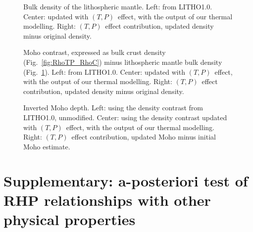\begin{subappendices}
\begin{figure}
	\begin{adjustbox}{center}
	\end{adjustbox}
	\caption[Bulk density of the lithospheric mantle, effect of temperature dependence.]{Bulk density of the lithospheric mantle.
	Left: from LITHO1.0.
	Center: updated with $(T,P)$~effect, with the output of our thermal modelling.
	Right: $(T,P)$~effect contribution, updated density minus original density.}
	\label{fig:RhoTP_RhoM}
\end{figure}

\begin{figure}
	\begin{adjustbox}{center}
	\end{adjustbox}
	\caption[Moho contrast, effect of temperature dependence.]{Moho contrast, expressed as bulk crust density (Fig.~\ref{fig:RhoTP_RhoC}) minus lithospheric mantle bulk density (Fig.~\ref{fig:RhoTP_RhoM}).
	Left: from LITHO1.0.
	Center: updated with $(T,P)$~effect, with the output of our thermal modelling. Right: $(T,P)$~effect contribution, updated density minus original density.}
	\label{fig:RhoTP_MohoContrast}
\end{figure}

\begin{figure}
	\begin{adjustbox}{center}
	\end{adjustbox}
	\caption[Inverted Moho depth, effect of temperature dependence.]{Inverted Moho depth.
	Left: using the density contrast from LITHO1.0, unmodified.
	Center: using the density contrast updated with $(T,P)$~effect, with the output of our thermal modelling.
	Right: $(T,P)$~effect contribution, updated Moho minus initial Moho estimate.}
	\label{fig:RhoTP_MohoDepth}
\end{figure}

\FloatBarrier

\section[Supplementary:~a-posteriori test of RHP relationships with other physical properties]{Supplementary: a-posteriori test of RHP relationships with other physical properties}
\label{s:ApplSup:Rel}


\end{subappendices}
